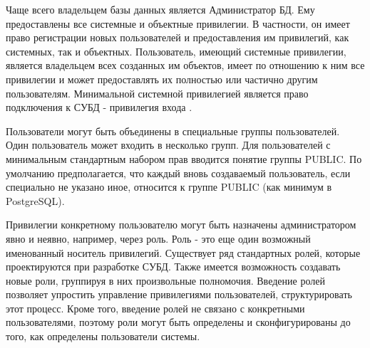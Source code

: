 Чаще всего владельцем базы данных является Администратор БД. Ему предоставлены все системные и объектные 
привилегии. В частности, он имеет право регистрации новых пользователей и предоставления им привилегий, как 
системных, так и объектных. Пользователь, имеющий системные привилегии, является владельцем всех созданных им
объектов, имеет по отношению к ним все привилегии и может предоставлять их полностью или частично другим 
пользователям. Минимальной системной привилегией является право подключения к СУБД - привилегия входа 
\autocite{Skakun}. 

Пользователи могут быть объединены в специальные группы пользователей. Один пользователь может входить в 
несколько групп. Для пользователей с минимальным стандартным набором прав вводится понятие группы PUBLIC. 
По умолчанию предполагается, что каждый вновь создаваемый пользователь, если специально не указано иное, 
относится к группе PUBLIC (как минимум в PostgreSQL).

Привилегии конкретному пользователю могут быть назначены администратором явно и неявно, например, через роль. 
Роль - это еще один возможный именованный носитель привилегий. Существует ряд стандартных ролей, которые 
проектируются при разработке СУБД. Также имеется возможность создавать новые роли, группируя в них произвольные 
полномочия. Введение ролей позволяет упростить управление привилегиями пользователей, структурировать этот 
процесс. Кроме того, введение ролей не связано с конкретными пользователями, поэтому роли могут быть определены 
и сконфигурированы до того, как определены пользователи системы.

